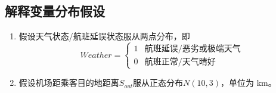 \subsection{解释变量分布假设}
\begin{enumerate}
    \item 假设天气状态/航班延误状态服从两点分布，即
        \[
         Weather = 
         \begin{cases}
                1 & \text{航班延误/恶劣或极端天气} \\
                0 & \text{航班正常/天气晴好}
         \end{cases}
        \]
    
    \item 假设机场距乘客目的地距离$S_{out}$服从正态分布$N(10,3)$，单位为 \si{\kilo\metre}。
\end{enumerate}
